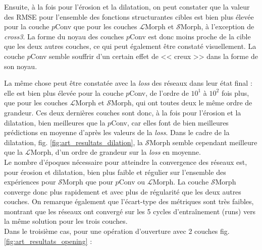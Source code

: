 \noindent Ensuite, à la fois pour l'érosion et la dilatation, on peut constater que la valeur des RMSE pour l'ensemble des fonctions structurantes cibles est bien plus élevée pour la couche $p$Conv que pour les couches $\mathcal{L}$Morph et $\mathcal{S}$Morph, à l'exception de \textit{cross3}. La forme du noyau des couches $p$Conv est donc moins proche de la cible que les deux autres couches, ce qui peut également être constaté visuellement. La couche $p$Conv semble souffrir d'un certain effet de << creux >> dans la forme de son noyau.


\newpage

\noindent La même chose peut être constatée avec la \textit{loss} des réseaux dans leur état final : elle est bien plus élevée pour la couche $p$Conv, de l'ordre de $10^1$ à $10^2$ fois plus, que pour les couches $\mathcal{L}$Morph et $\mathcal{S}$Morph, qui ont toutes deux le même ordre de grandeur. Ces deux dernières couches sont donc, à la fois pour l'érosion et la dilatation, bien meilleures que la $p$Conv, car elles font de bien meilleures prédictions en moyenne d'après les valeurs de la \textit{loss}. Dans le cadre de la dilatation, fig. \ref{fig:art_resultats_dilation}, la $\mathcal{S}$Morph semble cependant meilleure que la $\mathcal{L}$Morph, d'un ordre de grandeur sur la \textit{loss} en moyenne. \\

\vspace{-1.6mm}
\noindent Le nombre d'époques nécessaire pour atteindre la convergence des réseaux est, pour érosion et dilatation, bien plus faible et régulier sur l'ensemble des expériences pour $\mathcal{S}$Morph que pour $p$Conv ou $\mathcal{L}$Morph. La couche $\mathcal{S}$Morph converge donc plus rapidement et avec plus de régularité que les deux autres couches. 
On remarque également que l'écart-type des métriques sont très faibles, montrant que les réseaux ont convergé sur les 5 cycles d'entraînement (runs) vers la même solution pour les trois couches. \\



\vspace{-1.0mm}
Dans le troisième cas, pour une opération d'ouverture avec 2 couches fig. \ref{fig:art_resultats_opening} : \\

